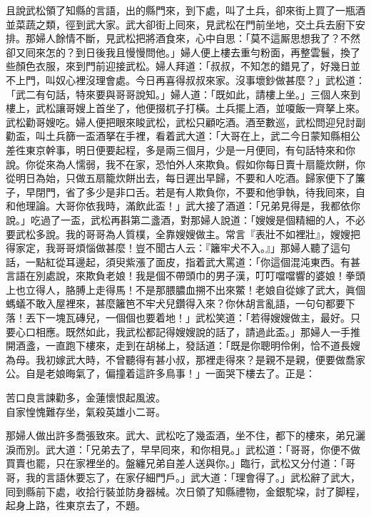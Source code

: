 且說武松領了知縣的言語，出的縣門來，到下處，叫了土兵，卻來街上買了一瓶酒並菜蔬之類，徑到武大家。武大卻街上囘來，見武松在門前坐地，交土兵去廚下安排。那婦人餘情不斷，見武松把將酒食來，心中自思：「莫不這厮思想我了？不然卻又囘來怎的？到日後我且慢慢問他。」婦人便上樓去重勻粉面，再整雲鬟，換了些顏色衣服，來到門前迎接武松。婦人拜道：「叔叔，不知怎的錯見了，好幾日並不上門，叫奴心裡沒理會處。今日再喜得叔叔來家。沒事壞鈔做甚麼？」武松道：「武二有句話，特來要與哥哥說知。」婦人道：「既如此，請樓上坐。」三個人來到樓上，武松讓哥嫂上首坐了，他便掇杌子打橫。土兵擺上酒，並嗄飯一齊拏上來。武松勸哥嫂吃。婦人便把眼來睃武松，武松只顧吃酒。酒至數巡，武松問迎兒討副勸盃，叫土兵篩一盃酒拏在手裡，看着武大道：「大哥在上，武二今日蒙知縣相公差徃東京幹事，明日便要起程，多是兩三個月，少是一月便囘，有句話特來和你說。你從來為人懦弱，我不在家，恐怕外人來欺負。假如你每日賣十扇籠炊餅，你從明日為始，只做五扇籠炊餅出去，每日遲出早歸，不要和人吃酒。歸家便下了簾子，早閉門，省了多少是非口舌。若是有人欺負你，不要和他爭執，待我囘來，自和他理論。大哥你依我時，滿飲此盃！」武大接了酒道：「兄弟見得是，我都依你說。」吃過了一盃，武松再斟第二盞酒，對那婦人說道：「嫂嫂是個精細的人，不必要武松多說。我的哥哥為人質樸，全靠嫂嫂做主。常言『表壯不如裡壯』，嫂嫂把得家定，我哥哥煩惱做甚麼！豈不聞古人云：『籬牢犬不入。』」{}那婦人聽了這句話，一點紅從耳邊起，須臾紫漲了面皮，指着武大罵道：「你這個混沌東西。有甚言語在別處說，來欺負老娘！我是個不帶頭巾的男子漢，叮叮噹噹響的婆娘！拳頭上也立得人，胳膊上走得馬！不是那腲膿血搠不出來鱉！老娘自從嫁了武大，眞個螞蟻不敢入屋裡來，甚麼籬笆不牢犬兒鑽得入來？你休胡言亂語，一句句都要下落！丟下一塊瓦磚兒，一個個也要着地！」{}武松笑道：「若得嫂嫂做主，最好。只要心口相應。既然如此，我武松都記得嫂嫂說的話了，請過此盃。」那婦人一手推開酒盞，一直跑下樓來，走到在胡梯上，發話道：「既是你聰明伶俐，恰不道長嫂為母。我初嫁武大時，不曾聽得有甚小叔，那裡走得來？是親不是親，便要做喬家公。自是老娘晦氣了，偏撞着這許多鳥事！」{}一面哭下樓去了。正是：

\begin{myquote}
苦口良言諫勸多，金蓮懷恨起風波。\\自家惶愧難存坐，氣殺英雄小二哥。
\end{myquote}

那婦人做出許多喬張致來。武大、武松吃了幾盃酒，坐不住，都下的樓來，弟兄灑淚而別。武大道：「兄弟去了，早早囘來，和你相見。」武松道：「哥哥，你便不做買賣也罷，{}只在家裡坐的。盤纏兄弟自差人送與你。」臨行，武松又分付道：「哥哥，我的言語休要忘了，在家仔細門戶。」武大道：「理會得了。」武松辭了武大，囘到縣前下處，收拾行裝並防身器械。次日領了知縣禮物，金銀駝垜，討了脚程，起身上路，徃東京去了，不題。

